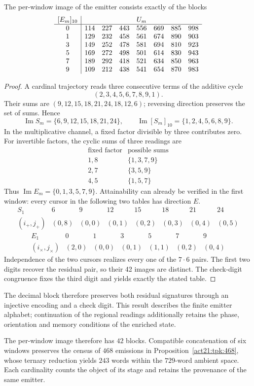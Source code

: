 \begin{proposition}
The per-window image of the emitter consists exactly of the blocks
\[
\begin{array}{c|rrrrrrr}
[E_m]_{10}&\multicolumn{7}{c}{U_m}\\ \hline
0&114&227&443&556&669&885&998\\
1&129&232&458&561&674&890&903\\
3&149&252&478&581&694&810&923\\
5&169&272&498&501&614&830&943\\
7&189&292&418&521&634&850&963\\
9&109&212&438&541&654&870&983
\end{array}
\]
\end{proposition}
\begin{proof}
A cardinal trajectory reads three consecutive terms of the additive cycle
\[
 (2,3,4,5,6,7,8,9,1).
\]
Their sums are
$(9,12,15,18,21,24,18,12,6)$; reversing direction preserves the set of sums.
Hence
\[
 \operatorname{Im}S_m=\{6,9,12,15,18,21,24\},\qquad
 \operatorname{Im}[S_m]_{10}=\{1,2,4,5,6,8,9\}.
\]
In the multiplicative channel, a fixed factor divisible by three contributes
zero. For invertible factors, the cyclic sums of three readings are
\[
\begin{array}{c|c}
\text{fixed factor}&\text{possible sums}\\\hline
1,8&\{1,3,7,9\}\\
2,7&\{3,5,9\}\\
4,5&\{1,5,7\}
\end{array}
\]
Thus $\operatorname{Im}E_m=\{0,1,3,5,7,9\}$.
Attainability can already be verified in the first window: every cursor in
the following two tables has direction $E$.
\[
\begin{array}{c|rrrrrrr}
S_1&6&9&12&15&18&21&24\\\hline
(i_+,j_+)&(0,8)&(0,0)&(0,1)&(0,2)&(0,3)&(0,4)&(0,5)
\end{array}
\]
\[
\begin{array}{c|rrrrrr}
E_1&0&1&3&5&7&9\\\hline
(i_\times,j_\times)&(2,0)&(0,0)&(0,1)&(1,1)&(0,2)&(0,4)
\end{array}
\]
Independence of the two cursors realizes every one of the $7\cdot6$ pairs.
The first two digits recover the residual pair, so their 42 images are
distinct. The check-digit congruence fixes the third digit and yields
exactly the stated table.
\end{proof}

The decimal block therefore preserves both residual signatures through an
injective encoding and a check digit. This result describes the finite
emitter alphabet; continuation of the regional readings additionally retains
the phase, orientation and memory conditions of the enriched state.

The per-window image therefore has \(42\) blocks. Compatible concatenation
of six windows preserves the census of \(468\) emissions in
Proposition~\ref{act21:tpk:468}, whose ternary reduction yields
\(243\) words within the \(729\)-word ambient space. Each cardinality
counts the object of its stage and retains the provenance of the same
emitter.
